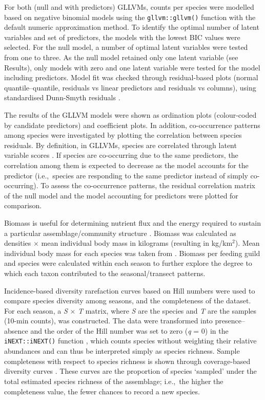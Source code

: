 \documentclass[preprint, 3p, authoryear]{elsarticle} %
\begin{document}
For both (null and with predictors) GLLVMs, counts per species were modelled based on negative binomial models \citep{linden2011} using the \texttt{gllvm::gllvm()} function with the default numeric approximation method. To identify the optimal number of latent variables and set of predictors, the models with the lowest BIC values were selected. For the null model, a number of optimal latent variables were tested from one to three. As the null model retained only one latent variable (see Results), only models with zero and one latent variable were tested for the model including predictors. Model fit was checked through residual-based plots (normal quantile--quantile, residuals vs linear predictors and residuals vs columns), using standardised Dunn-Smyth residuals \citep{niku2019}.

The results of the GLLVM models were shown as ordination plots (colour-coded by candidate predictors) and coefficient plots. In addition, co-occurrence patterns among species were investigated by plotting the correlation between species residuals. By definition, in GLLVMs, species are correlated through latent variable scores \citep{niku2019}. If species are co-occurring due to the same predictors, the correlation among them is expected to decrease as the model accounts for the predictor (i.e.,~species are responding to the same predictor instead of simply co-occurring). To assess the co-occurrence patterns, the residual correlation matrix of the null model and the model accounting for predictors were plotted for comparison.

Biomass is useful for determining nutrient flux and the energy required to sustain a particular assemblage/community structure \citep[e.g.,][]{woehler1997, kurasawa2024, kokubun2025}. Biomass was calculated as densities \(\times\) mean individual body mass in kilograms (resulting in kg/km$^2$). Mean individual body mass for each species was taken from \citet{robertson2015}. Biomass per feeding guild and species were calculated within each season to further explore the degree to which each taxon contributed to the seasonal/transect patterns.

Incidence-based diversity rarefaction curves based on Hill numbers \citep{chao2014rarefaction, chao2020} were used to compare species diversity among seasons, and the completeness of the dataset. For each season, a \emph{S} \(\times\) \emph{T} matrix, where \emph{S} are the species and \emph{T} are the samples (10-min counts), was constructed. The data were transformed into presence--absence and the order of the Hill number was set to zero (\emph{q} = 0) in the \texttt{iNEXT::iNEXT()} function \citep{hsieh2016}, which counts species without weighting their relative abundances and can thus be interpreted simply as species richness. Sample completeness with respect to species richness is shown through coverage-based diversity curves \citep{chao2012}. These curves are the proportion of species `sampled' under the total estimated species richness of the assemblage; i.e.,~the higher the completeness value, the fewer chances to record a new species.
\end{document}
